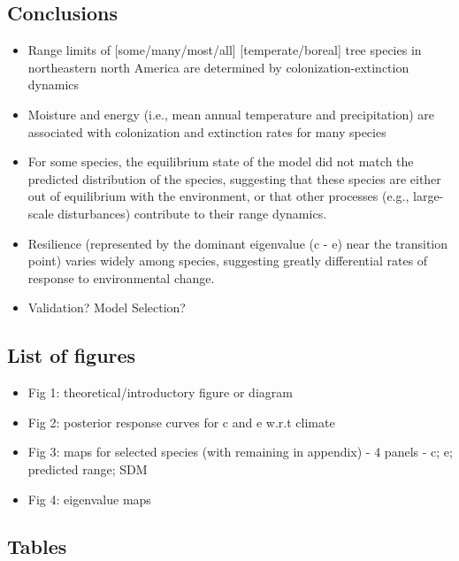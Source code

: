 \documentclass[11pt]{article}
\begin{document}
\subsection*{Conclusions}
\begin{itemize}
	\item Range limits of [some/many/most/all] [temperate/boreal] tree species in northeastern north America are determined by colonization-extinction dynamics
	\item Moisture and energy (i.e., mean annual temperature and precipitation) are associated with colonization and extinction rates for many species
	\item For some species, the equilibrium state of the model did not match the predicted distribution of the species, suggesting that these species are either out of equilibrium with the environment, or that other processes (e.g., large-scale disturbances) contribute to their range dynamics.
	\item Resilience (represented by the dominant eigenvalue (c - e) near the transition point) varies widely among species, suggesting greatly differential rates of response to environmental change.
	\item Validation? Model Selection?
\end{itemize}


\subsection*{List of figures}
\begin{itemize}
	\item Fig 1: theoretical/introductory figure or diagram
	\item Fig 2: posterior response curves for c and e w.r.t climate
	\item Fig 3: maps for selected species (with remaining in appendix) - 4 panels - c; e; predicted range; SDM
	\item Fig 4: eigenvalue maps
\end{itemize}

\subsection*{Tables}

\end{document}
